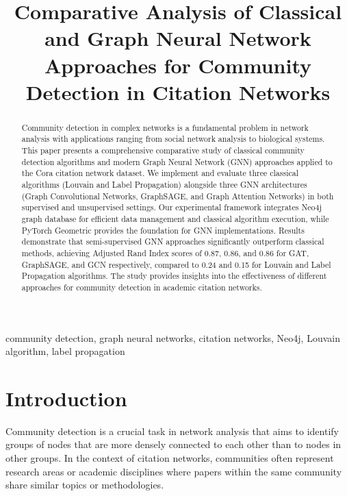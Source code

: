 \documentclass[conference]{IEEEtran}
\begin{document}
\title{Comparative Analysis of Classical and Graph Neural Network Approaches for Community Detection in Citation Networks}

\author{
}

\maketitle

\begin{abstract}
Community detection in complex networks is a fundamental problem in network analysis with applications ranging from social network analysis to biological systems. This paper presents a comprehensive comparative study of classical community detection algorithms and modern Graph Neural Network (GNN) approaches applied to the Cora citation network dataset. We implement and evaluate three classical algorithms (Louvain and Label Propagation) alongside three GNN architectures (Graph Convolutional Networks, GraphSAGE, and Graph Attention Networks) in both supervised and unsupervised settings. Our experimental framework integrates Neo4j graph database for efficient data management and classical algorithm execution, while PyTorch Geometric provides the foundation for GNN implementations. Results demonstrate that semi-supervised GNN approaches significantly outperform classical methods, achieving Adjusted Rand Index scores of 0.87, 0.86, and 0.86 for GAT, GraphSAGE, and GCN respectively, compared to 0.24 and 0.15 for Louvain and Label Propagation algorithms. The study provides insights into the effectiveness of different approaches for community detection in academic citation networks.
\end{abstract}

\begin{IEEEkeywords}
community detection, graph neural networks, citation networks, Neo4j, Louvain algorithm, label propagation
\end{IEEEkeywords}

\section{Introduction}

Community detection is a crucial task in network analysis that aims to identify groups of nodes that are more densely connected to each other than to nodes in other groups. In the context of citation networks, communities often represent research areas or academic disciplines where papers within the same community share similar topics or methodologies.
\end{document}

